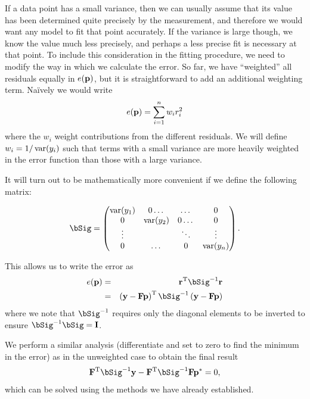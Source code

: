 \documentclass[12pt,a4paper]{tufte-handout}
\begin{document}
If a data point has a small variance, then we can usually assume that its value has been determined quite precisely by the measurement, and therefore we would want any model to fit that point accurately. If the variance is large though, we know the value much less precisely, and perhaps a less precise fit is necessary at that point. To include this consideration in the fitting procedure, we need to modify the way in which we calculate the error. So far, we have ``weighted'' all residuals equally in $e(\mathbf{p})$, but it is straightforward to add an additional weighting term. Na\"ively we would write
\begin{equation}
  e(\mathbf{p}) = \sum_{i=1}^n w_ir_i^2
\end{equation}
where the $w_i$ weight contributions from the different residuals. We will define $w_i=1/\operatorname*{var}(y_i)$ such that terms with a small variance are more heavily weighted in the error function than those with a large variance.

It will turn out to be mathematically more convenient if we define the following matrix:

\begin{equation}
  \bSig = \begin{pmatrix}
\var(y_1) & 0 \dots & \dots & 0 \\
0 & \var(y_2) & 0 \dots & 0 \\
\vdots & & \ddots & \vdots \\
0 & \dots & 0 & \var(y_n)
\end{pmatrix}.
\end{equation}


This allows us to write the error as
\begin{eqnarray}
  e(\bp) &=& \br^\rT \inv{\bSig} \br\\
  &=& \left(\by-\bF\bp\right)^\rT \inv{\bSig} \left(\by-\bF\bp\right)
\end{eqnarray}
where we note that $\inv{\bSig}$ requires only the diagonal elements to be inverted to ensure $\inv{\bSig}\bSig =\bI$.

We perform a similar analysis (differentiate and set to zero to find the minimum in the error) as in the unweighted case to obtain the final result
\begin{equation}
  \bF^\rT\inv{\bSig}\by-\bF^\rT\inv{\bSig}\bF\bp^*=0,
\end{equation}
which can be solved using the methods we have already established.
\end{document}
